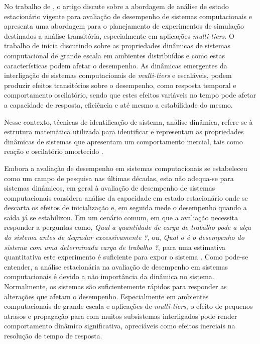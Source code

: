 No trabalho de , o artigo discute sobre a abordagem de análise de estado estacionário vigente para avaliação de desempenho de sistemas computacionais e apresenta uma abordagem para o planejamento de experimentos de simulação destinados a análise transitória, especialmente em aplicações \textit{multi-tiers}.
O trabalho de  inicia discutindo sobre as propriedades dinâmicas de sistemas computacional de grande escala em ambientes distribuídos e como estas características podem afetar o desempenho. As dinâmicas emergentes da interligação de sistemas computacionais de \textit{multi-tiers} e escaláveis, podem produzir efeitos transitórios sobre o desempenho, como resposta temporal e comportamento oscilatório, sendo que estes efeitos variáveis no tempo pode afetar a capacidade de resposta, eficiência e até mesmo a estabilidade do mesmo. 

\begin{citacao}
	Nesse contexto, técnicas de identificação de sistema, análise dinâmica, refere-se à estrutura matemática utilizada para identificar e representam as propriedades dinâmicas de sistemas que apresentam um comportamento inercial, tais como reação e oscilatório amortecido \cite{Lourenco2015}. 
\end{citacao}

Embora a avaliação de desempenho em sistemas computacionais se estabeleceu como um campo de pesquisa nas últimas décadas, esta não adequa-se para sistemas dinâmicos, em geral à avaliação de desempenho de sistemas computacionais considera análise da capacidade em estado estacionário onde se descarta os efeitos de inicialização e, em seguida mede o desempenho quando a saída já se estabilizou. Em um cenário comum, em que a avaliação necessita responder a perguntas como, \textit{Qual a quantidade de carga de trabalho pode a alça do sistema antes de degradar excessivamente ?}, ou, \textit{Qual o é o desempenho do sistema com uma determinada carga de trabalho ?}, para uma estimativa quantitativa este experimento é suficiente para expor o sistema \cite{Lourenco2015}.
Como pode-se entender, a análise estacionária na avaliação de desempenho em sistemas computacionais é devido a não importância da dinâmica no sistema. Normalmente, os sistemas são suficientemente rápidos para responder as alterações que afetam o desempenho. Especialmente em ambientes computacionais de grande escala e aplicações de \textit{multi-tiers}, o efeito de pequenos atrasos e propagação para com muitos subsistemas interligados pode render comportamento dinâmico significativa, apreciáveis como efeitos inerciais na resolução de tempo de resposta. 

